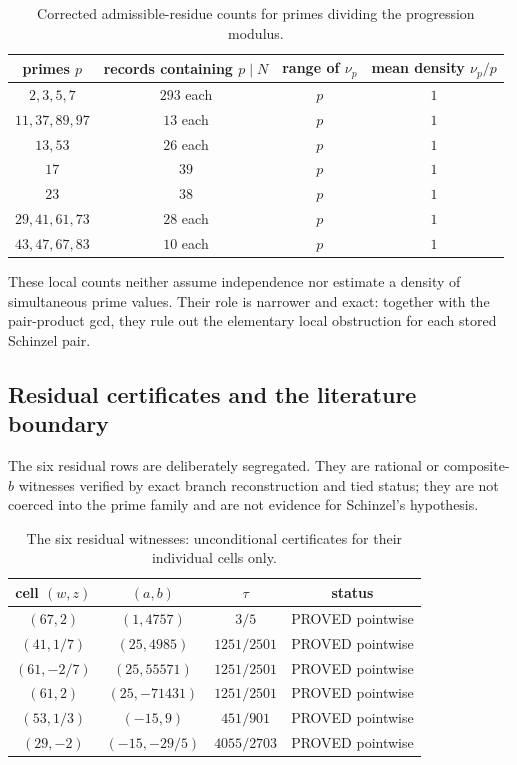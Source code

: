 \begin{table}[ht]
\centering
\small
\begin{tabular}{c|c|c|c}
primes $p$ & records containing $p\mid N$ & range of $\nu_p$ & mean density $\nu_p/p$\\ \hline
$2,3,5,7$ & $293$ each & $p$ & $1$\\
$11,37,89,97$ & $13$ each & $p$ & $1$\\
$13,53$ & $26$ each & $p$ & $1$\\
$17$ & $39$ & $p$ & $1$\\
$23$ & $38$ & $p$ & $1$\\
$29,41,61,73$ & $28$ each & $p$ & $1$\\
$43,47,67,83$ & $10$ each & $p$ & $1$
\end{tabular}
\caption{Corrected admissible-residue counts for primes dividing the progression modulus.}
\end{table}

These local counts neither assume independence nor estimate a density of
simultaneous prime values.  Their role is narrower and exact: together with
the pair-product gcd, they rule out the elementary local obstruction for
each stored Schinzel pair.

\subsection{Residual certificates and the literature boundary}

The six residual rows are deliberately segregated.  They are rational or
composite-$b$ witnesses verified by exact branch reconstruction and tied
status; they are not coerced into the prime family and are not evidence for
Schinzel's hypothesis.

\begin{table}[ht]
\centering
\small
\begin{tabular}{c|c|c|c}
cell $(w,z)$ & $(a,b)$ & $\tau$ & status\\ \hline
$(67,2)$ & $(1,4757)$ & $3/5$ & PROVED pointwise\\
$(41,1/7)$ & $(25,4985)$ & $1251/2501$ & PROVED pointwise\\
$(61,-2/7)$ & $(25,55571)$ & $1251/2501$ & PROVED pointwise\\
$(61,2)$ & $(25,-71431)$ & $1251/2501$ & PROVED pointwise\\
$(53,1/3)$ & $(-15,9)$ & $451/901$ & PROVED pointwise\\
$(29,-2)$ & $(-15,-29/5)$ & $4055/2703$ & PROVED pointwise
\end{tabular}
\caption{The six residual witnesses: unconditional certificates for their individual cells only.}
\end{table}

